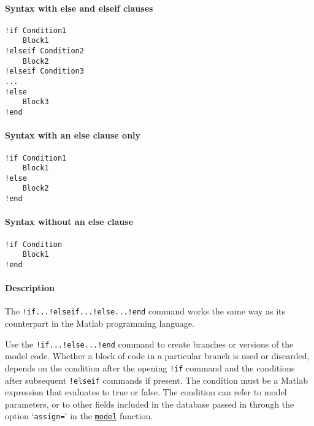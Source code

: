


	\paragraph{Syntax with else and elseif
clauses}\label{syntax-with-else-and-elseif-clauses}

\begin{verbatim}
!if Condition1
    Block1
!elseif Condition2
    Block2
!elseif Condition3
...
!else
    Block3
!end
\end{verbatim}

\paragraph{Syntax with an else clause
only}\label{syntax-with-an-else-clause-only}

\begin{verbatim}
!if Condition1
    Block1
!else
    Block2
!end
\end{verbatim}

\paragraph{Syntax without an else
clause}\label{syntax-without-an-else-clause}

\begin{verbatim}
!if Condition
    Block1
!end
\end{verbatim}

\paragraph{Description}\label{description}

The \texttt{!if...!elseif...!else...!end} command works the same way as
its counterpart in the Matlab programming language.

Use the \texttt{!if...!else...!end} command to create branches or
versions of the model code. Whether a block of code in a particular
branch is used or discarded, depends on the condition after the opening
\texttt{!if} command and the conditions after subsequent
\texttt{!elseif} commands if present. The condition must be a Matlab
expression that evaluates to true or false. The condition can refer to
model parameters, or to other fields included in the database passed in
through the option `\texttt{assign=}' in the
\href{model/model}{\texttt{model}} function.

